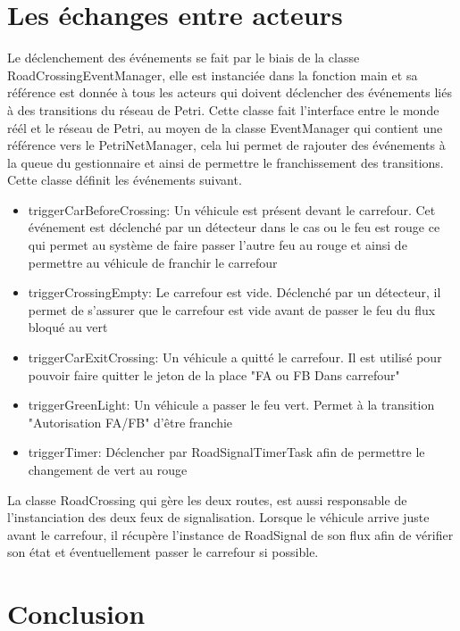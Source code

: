 \documentclass[11pt,a4paper, openany]{memoir}
\begin{document}
\chapter{Les échanges entre acteurs}

Le déclenchement des événements se fait par le biais de la classe RoadCrossingEventManager, elle est instanciée dans la fonction main et sa référence est donnée à tous les acteurs qui doivent déclencher des événements liés à des transitions du réseau de Petri. Cette classe fait l'interface entre le monde réél et le réseau de Petri, au moyen de la classe EventManager qui contient une référence vers le PetriNetManager, cela lui permet de rajouter des événements à la queue du gestionnaire et ainsi de permettre le franchissement des transitions.
Cette classe définit les événements suivant.\\
\begin{itemize}
\item triggerCarBeforeCrossing: Un véhicule est présent devant le carrefour. Cet événement est déclenché par un détecteur  dans le cas ou le feu est rouge ce qui permet au système de faire passer l'autre feu au rouge et ainsi de permettre au véhicule de franchir le carrefour
\item triggerCrossingEmpty: Le carrefour est vide. Déclenché par un détecteur, il permet de s'assurer que le carrefour est vide avant de passer le feu du flux bloqué au vert
\item triggerCarExitCrossing: Un véhicule a quitté le carrefour. Il est utilisé pour pouvoir faire quitter le jeton de la place "FA ou FB Dans carrefour"
\item triggerGreenLight: Un véhicule a passer le feu vert. Permet à la transition "Autorisation FA/FB" d'être franchie
\item triggerTimer: Déclencher par RoadSignalTimerTask afin de permettre le changement de vert au rouge\\
\end{itemize}
La classe RoadCrossing qui gère les deux routes, est aussi responsable de l'instanciation des deux feux de signalisation. Lorsque le véhicule arrive juste avant le carrefour, il récupère l'instance de RoadSignal de son flux afin de vérifier son état et éventuellement passer le carrefour si possible.

\chapter{Conclusion}


%
\end{document}
